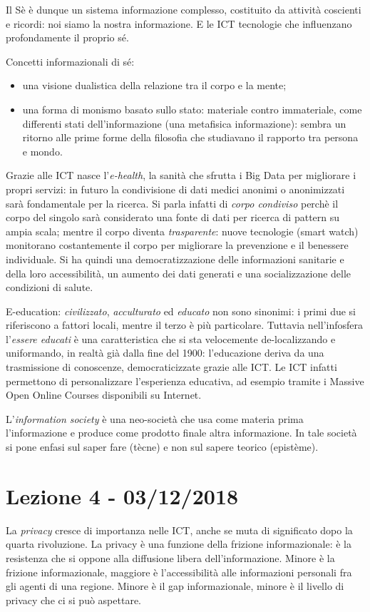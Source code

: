 \documentclass[a4page, 11pt]{article}
\begin{document}
Il Sè è dunque un sistema informazione complesso, costituito da attività coscienti e ricordi: noi siamo la nostra informazione.
E le ICT tecnologie che influenzano profondamente il proprio sé.

Concetti informazionali di sé:
\begin{itemize}
  \item una visione dualistica della relazione tra il corpo e la mente;
  \item una forma di monismo basato sullo stato: materiale contro immateriale, come differenti stati dell'informazione (una metafisica informazione): sembra un ritorno alle prime forme della filosofia che studiavano il rapporto tra persona e mondo.
\end{itemize}


Grazie alle ICT nasce l'\textit{e-health}, la sanità che sfrutta i Big Data per migliorare i propri servizi: in futuro la condivisione di dati medici anonimi o anonimizzati sarà fondamentale per la ricerca.
Si parla infatti di \textit{corpo condiviso} perchè il corpo del singolo sarà considerato una fonte di dati per ricerca di pattern su ampia scala; mentre il corpo diventa \textit{trasparente}: nuove tecnologie (smart watch) monitorano costantemente il corpo per migliorare la prevenzione e il benessere individuale.
Si ha quindi una democratizzazione delle informazioni sanitarie e della loro accessibilità, un aumento dei dati generati e una socializzazione delle condizioni di salute.

E-education: \textit{civilizzato}, \textit{acculturato} ed \textit{educato} non sono sinonimi: i primi due si riferiscono a fattori locali, mentre il terzo è più particolare.
Tuttavia nell'infosfera l'\textit{essere educati} è una caratteristica che si sta velocemente de-localizzando e uniformando, in realtà già dalla fine del 1900: l'educazione deriva da una trasmissione di conoscenze, democraticizzate grazie alle ICT.
Le ICT infatti permettono di personalizzare l'esperienza educativa, ad esempio tramite i Massive Open Online Courses disponibili su Internet.

L'\textit{information society} è una neo-società che usa come materia prima l'informazione e produce come prodotto finale altra informazione.
In tale società si pone enfasi sul saper fare (tècne) e non sul sapere teorico (epistème).



\section*{Lezione 4 - 03/12/2018}
La \textit{privacy} cresce di importanza nelle ICT, anche se muta di significato dopo la quarta rivoluzione.
La privacy è una funzione della frizione informazionale: è la resistenza che si oppone alla diffusione libera dell'informazione.
Minore è la frizione informazionale, maggiore è l'accessibilità alle informazioni personali fra gli agenti di una regione.
Minore è il gap informazionale, minore è il livello di privacy che ci si può aspettare.
\end{document}
